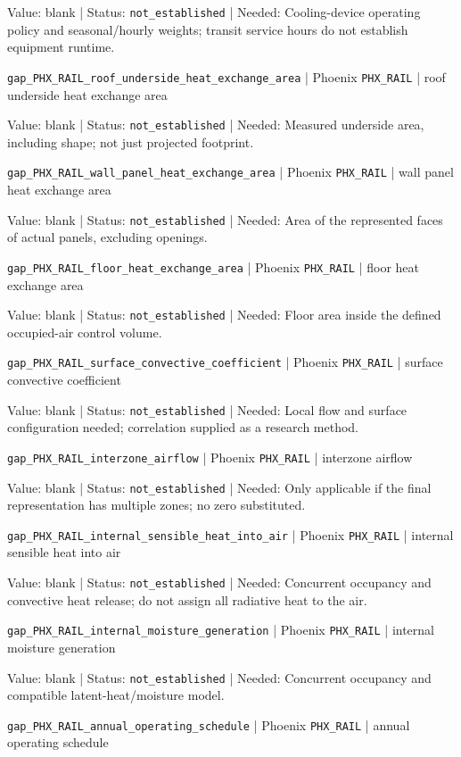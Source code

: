 Value: blank | Status: \nolinkurl{not_established} | Needed: Cooling-device operating policy and seasonal/hourly weights; transit service hours do not establish equipment runtime.

\nolinkurl{gap_PHX_RAIL_roof_underside_heat_exchange_area} | Phoenix \nolinkurl{PHX_RAIL}  | roof underside heat exchange area

Value: blank | Status: \nolinkurl{not_established} | Needed: Measured underside area, including shape; not just projected footprint.

\nolinkurl{gap_PHX_RAIL_wall_panel_heat_exchange_area} | Phoenix \nolinkurl{PHX_RAIL}  | wall panel heat exchange area

Value: blank | Status: \nolinkurl{not_established} | Needed: Area of the represented faces of actual panels, excluding openings.

\nolinkurl{gap_PHX_RAIL_floor_heat_exchange_area} | Phoenix \nolinkurl{PHX_RAIL}  | floor heat exchange area

Value: blank | Status: \nolinkurl{not_established} | Needed: Floor area inside the defined occupied-air control volume.

\nolinkurl{gap_PHX_RAIL_surface_convective_coefficient} | Phoenix \nolinkurl{PHX_RAIL}  | surface convective coefficient

Value: blank | Status: \nolinkurl{not_established} | Needed: Local flow and surface configuration needed; correlation supplied as a research method.

\nolinkurl{gap_PHX_RAIL_interzone_airflow} | Phoenix \nolinkurl{PHX_RAIL}  | interzone airflow

Value: blank | Status: \nolinkurl{not_established} | Needed: Only applicable if the final representation has multiple zones; no zero substituted.

\nolinkurl{gap_PHX_RAIL_internal_sensible_heat_into_air} | Phoenix \nolinkurl{PHX_RAIL}  | internal sensible heat into air

Value: blank | Status: \nolinkurl{not_established} | Needed: Concurrent occupancy and convective heat release; do not assign all radiative heat to the air.

\nolinkurl{gap_PHX_RAIL_internal_moisture_generation} | Phoenix \nolinkurl{PHX_RAIL}  | internal moisture generation

Value: blank | Status: \nolinkurl{not_established} | Needed: Concurrent occupancy and compatible latent-heat/moisture model.

\nolinkurl{gap_PHX_RAIL_annual_operating_schedule} | Phoenix \nolinkurl{PHX_RAIL}  | annual operating schedule

